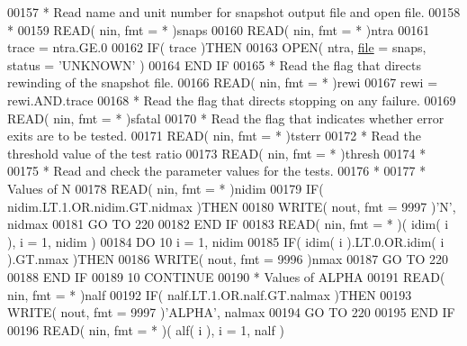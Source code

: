 \begin{DoxyCode}
00157 \textcolor{comment}{*     Read name and unit number for snapshot output file and open file.}
00158 \textcolor{comment}{*}
00159       \textcolor{keyword}{READ}( nin, fmt = * )snaps
00160       \textcolor{keyword}{READ}( nin, fmt = * )ntra
00161       trace = ntra.GE.0
00162       \textcolor{keywordflow}{IF}( trace )\textcolor{keywordflow}{THEN}
00163          \textcolor{keyword}{OPEN}( ntra, \hyperlink{structfile}{file} = snaps, status = \textcolor{stringliteral}{'UNKNOWN'} )
00164 \textcolor{keywordflow}{      END IF}
00165 \textcolor{comment}{*     Read the flag that directs rewinding of the snapshot file.}
00166       \textcolor{keyword}{READ}( nin, fmt = * )rewi
00167       rewi = rewi.AND.trace
00168 \textcolor{comment}{*     Read the flag that directs stopping on any failure.}
00169       \textcolor{keyword}{READ}( nin, fmt = * )sfatal
00170 \textcolor{comment}{*     Read the flag that indicates whether error exits are to be tested.}
00171       \textcolor{keyword}{READ}( nin, fmt = * )tsterr
00172 \textcolor{comment}{*     Read the threshold value of the test ratio}
00173       \textcolor{keyword}{READ}( nin, fmt = * )thresh
00174 \textcolor{comment}{*}
00175 \textcolor{comment}{*     Read and check the parameter values for the tests.}
00176 \textcolor{comment}{*}
00177 \textcolor{comment}{*     Values of N}
00178       \textcolor{keyword}{READ}( nin, fmt = * )nidim
00179       \textcolor{keywordflow}{IF}( nidim.LT.1.OR.nidim.GT.nidmax )\textcolor{keywordflow}{THEN}
00180          \textcolor{keyword}{WRITE}( nout, fmt = 9997 )\textcolor{stringliteral}{'N'}, nidmax
00181          \textcolor{keywordflow}{GO TO} 220
00182 \textcolor{keywordflow}{      END IF}
00183       \textcolor{keyword}{READ}( nin, fmt = * )( idim( i ), i = 1, nidim )
00184       \textcolor{keywordflow}{DO} 10 i = 1, nidim
00185          \textcolor{keywordflow}{IF}( idim( i ).LT.0.OR.idim( i ).GT.nmax )\textcolor{keywordflow}{THEN}
00186             \textcolor{keyword}{WRITE}( nout, fmt = 9996 )nmax
00187             \textcolor{keywordflow}{GO TO} 220
00188 \textcolor{keywordflow}{         END IF}
00189    10 \textcolor{keywordflow}{CONTINUE}
00190 \textcolor{comment}{*     Values of ALPHA}
00191       \textcolor{keyword}{READ}( nin, fmt = * )nalf
00192       \textcolor{keywordflow}{IF}( nalf.LT.1.OR.nalf.GT.nalmax )\textcolor{keywordflow}{THEN}
00193          \textcolor{keyword}{WRITE}( nout, fmt = 9997 )\textcolor{stringliteral}{'ALPHA'}, nalmax
00194          \textcolor{keywordflow}{GO TO} 220
00195 \textcolor{keywordflow}{      END IF}
00196       \textcolor{keyword}{READ}( nin, fmt = * )( alf( i ), i = 1, nalf )

\end{DoxyCode}
